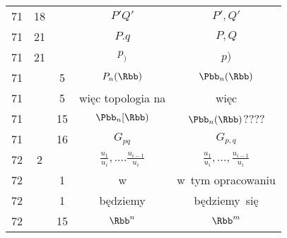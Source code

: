 \documentclass[a4paper,11pt]{article}
\numberwithin{equation}{section}
\begin{document}
\begin{center}
\begin{tabular}{|c|c|c|c|c|}
    71  & 18 & & $P' Q'$ & $P', Q'$ \\
    71  & 21 & & $P.q$ & $P, Q$ \\
    71  & 21 & & $p_{ ) }$ & $p )$ \\
    71  & & \hphantom{0}5 & $P_{ n }( \Rbb )$ & $\Pbb_{ n }( \Rbb )$ \\
    71  & & \hphantom{0}5 & więc topologia na & więc \\
    71  & & 15 & $\Pbb_{ n }[ \Rbb )$ & $\Pbb_{ n }( \Rbb )$???? \\
    71  & & 16 & $G_{ pq }$ & $G_{ p, q }$ \\
    72  & \hphantom{0}2 & & $\frac{ u_{ 1 } }{ u_{ i } }, \ldots.
                 \frac{ u_{ i - 1 } }{ u_{ i } }$
           & $\frac{ u_{ 1 } }{ u_{ i } }, \ldots,
             \frac{ u_{ i - 1 } }{ u_{ i } }$ \\
    72  & & \hphantom{0}1 & w & w~tym opracowaniu \\
    72  & & \hphantom{0}1 & będziemy & będziemy~się \\
    72  & & 15 & $\Rbb^{ n }$ & $\Rbb^{ m }$ \\
    \hline
  \end{tabular}





  \newpage


\end{center}
\end{document}
